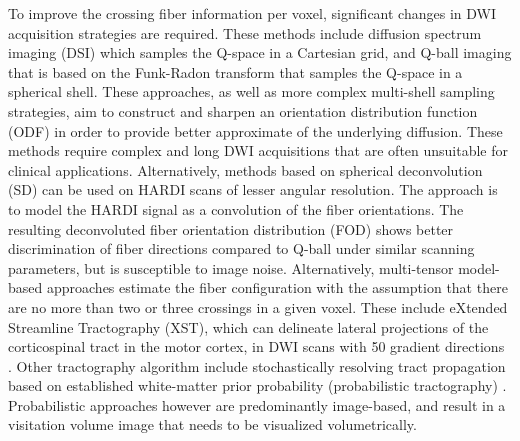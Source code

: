 To improve the crossing fiber information per voxel, significant changes in DWI acquisition strategies are required. These methods include diffusion spectrum imaging (DSI)\cite{Wedeen2005,Wedeen2008} which samples the Q-space in a Cartesian grid, and Q-ball imaging that is based on the Funk-Radon transform \cite{Cho2008,Descoteaux2007a} that samples the Q-space in a spherical shell. These approaches, as well as more complex multi-shell sampling strategies, aim to construct and sharpen an orientation distribution function (ODF) in order to provide better approximate of the underlying diffusion. These methods require complex and long DWI acquisitions that are often unsuitable for clinical applications. Alternatively, methods based on spherical deconvolution (SD) can be used on HARDI scans of lesser angular resolution. The approach is to model the HARDI signal as a convolution of the fiber orientations. The resulting deconvoluted fiber orientation distribution (FOD) shows better discrimination of fiber directions compared to Q-ball under similar scanning parameters, but is susceptible to image noise\cite{Anderson2005,DellAcqua2007,Tournier2004}. Alternatively, multi-tensor model-based approaches estimate the fiber configuration with the assumption that there are no more than two or three crossings in a given voxel. These include eXtended Streamline Tractography (XST), which can delineate lateral projections of the corticospinal tract in the motor cortex, in DWI scans with 50 gradient directions \cite{Qazi2009}. Other tractography algorithm include stochastically resolving tract propagation based on established white-matter prior probability (probabilistic tractography) \cite{Behrens2007}. Probabilistic approaches however are predominantly image-based, and result in a visitation volume image that needs to be visualized volumetrically. 

